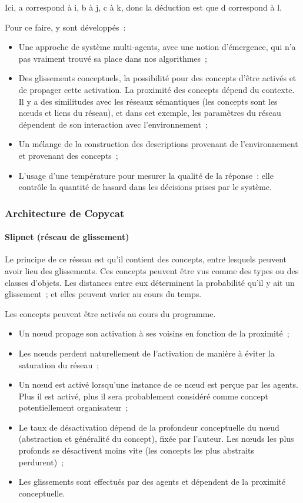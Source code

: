 \documentclass[a4paper, 12pt]{article}
\begin{document}
Ici, a correspond à i, b à j, c à k, donc la déduction est que d correspond à l.

Pour ce faire, y sont développés~:

\begin{itemize}
 \item Une approche de système multi-agents, avec une notion d'émergence, qui n'a pas vraiment trouvé sa place dans nos algorithmes~;
 \item Des glissements conceptuels, la possibilité pour des concepts d'être activés et de propager cette activation. La proximité des concepts dépend du contexte. Il y a des similitudes avec les réseaux sémantiques (les concepts sont les n\oe{}uds et liens du réseau), et dans cet exemple, les paramètres du réseau dépendent de son interaction avec l'environnement~;
 \item Un mélange de la construction des descriptions provenant de l'environnement et provenant des concepts~;
 \item L'usage d'une température pour mesurer la qualité de la réponse~: elle contrôle la quantité de hasard dans les décisions prises par le système.
\end{itemize}

\subsubsection{Architecture de Copycat}

\paragraph{Slipnet (réseau de glissement)}
Le principe de ce réseau est qu'il contient des concepts, entre lesquels peuvent avoir lieu des glissements. Ces concepts peuvent être vus comme des types ou des classes d'objets. Les distances entre eux déterminent la probabilité qu'il y ait un glissement~; et elles peuvent varier au cours du temps.

Les concepts peuvent être activés au cours du programme.

\begin{itemize}
 \item Un n\oe{}ud propage son activation à ses voisins en fonction de la proximité~;
 \item Les n\oe{}uds perdent naturellement de l'activation de manière à éviter la saturation du réseau~;
 \item Un n\oe{}ud est activé lorsqu'une instance de ce n\oe{}ud est perçue par les agents. Plus il est activé, plus il sera probablement considéré comme concept potentiellement organisateur~;
 \item Le taux de désactivation dépend de la profondeur conceptuelle du n\oe{}ud (abstraction et généralité du concept), fixée par l'auteur. Les n\oe{}uds les plus profonds se désactivent moins vite (les concepts les plus abstraits perdurent)~;
 \item Les glissements sont effectués par des agents et dépendent de la proximité conceptuelle.
\end{itemize}
\end{document}
